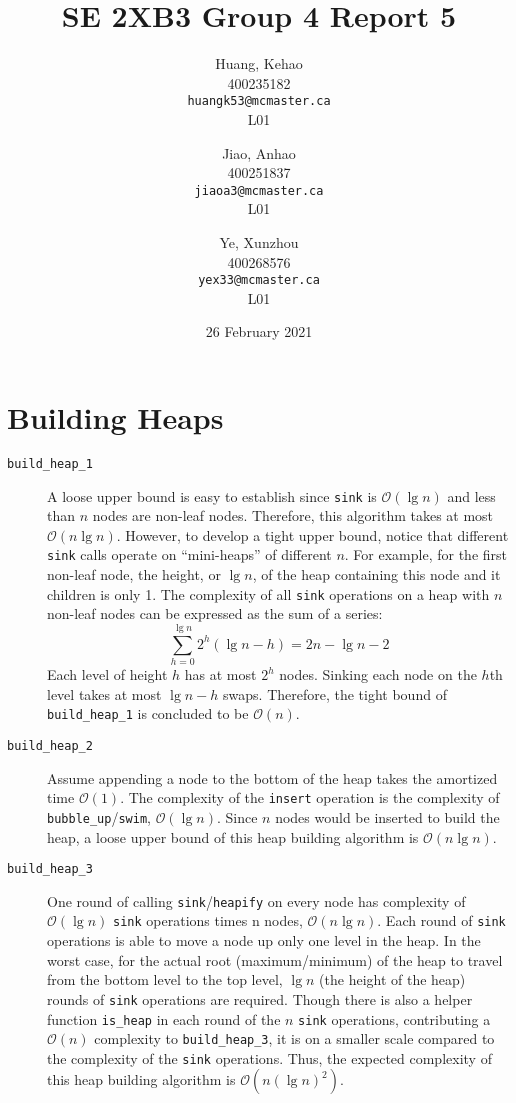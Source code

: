 \documentclass[titlepage, 12pt]{article}
\title{SE 2XB3 Group 4 Report 5}
\author{
  Huang, Kehao \\
  400235182 \\
  \texttt{huangk53@mcmaster.ca} \\
  L01
  \and
  Jiao, Anhao \\
  400251837 \\
  \texttt{jiaoa3@mcmaster.ca} \\
  L01
  \and
  Ye, Xunzhou \\
  400268576 \\
  \texttt{yex33@mcmaster.ca} \\
  L01
}
\date{26 February 2021}
\begin{document}
\maketitle{}

\newpage{}

\section{Building Heaps}
\label{sec:build}

\begin{description}
\item[\texttt{build\_heap\_1}] A loose upper bound is easy to establish since
  \texttt{sink} is \(\mathcal{O}(\lg{n})\) and less than \(n\) nodes are
  non-leaf nodes. Therefore, this algorithm takes at most
  \(\mathcal{O}(n\lg{n})\). However, to develop a tight upper bound, notice that
  different \texttt{sink} calls operate on ``mini-heaps'' of different \(n\).
  For example, for the first non-leaf node, the height, or \(\lg{n}\), of the
  heap containing this node and it children is only 1. The complexity of all
  \texttt{sink} operations on a heap with \(n\) non-leaf nodes can be expressed
  as the sum of a series:
  \begin{displaymath}
    \sum_{h = 0}^{\lg{n}} 2^h (\lg{n} - h) = 2n - \lg{n} - 2
  \end{displaymath}
  Each level of height \(h\) has at most \(2^h\) nodes. Sinking each node on the
  \(h\)th level takes at most \(\lg{n} - h\) swaps. Therefore, the tight bound
  of \texttt{build\_heap\_1} is concluded to be \(\mathcal{O}(n)\).
\item[\texttt{build\_heap\_2}] Assume appending a node to the bottom of the heap
  takes the amortized time \(\mathcal{O}(1)\). The complexity of the
  \texttt{insert} operation is the complexity of
  \texttt{bubble\_up}/\texttt{swim}, \(\mathcal{O}(\lg{n})\). Since \(n\) nodes
  would be inserted to build the heap, a loose upper bound of this heap building
  algorithm is \(\mathcal{O}(n\lg{n})\).
\item[\texttt{build\_heap\_3}] One round of calling
  \texttt{sink}/\texttt{heapify} on every node has complexity of
  \(\mathcal{O}(\lg{n})\) \texttt{sink} operations times n nodes,
  \(\mathcal{O}(n\lg{n})\). Each round of \texttt{sink} operations is able to
  move a node up only one level in the heap. In the worst case, for the actual
  root (maximum/minimum) of the heap to travel from the bottom level to the top
  level, \(\lg{n}\) (the height of the heap) rounds of \texttt{sink} operations
  are required. Though there is also a helper function \texttt{is\_heap} in each
  round of the \(n\) \texttt{sink} operations, contributing a \(\mathcal{O}(n)\)
  complexity to \texttt{build\_heap\_3}, it is on a smaller scale compared to
  the complexity of the \texttt{sink} operations. Thus, the expected complexity
  of this heap building algorithm is \(\mathcal{O}(n (\lg{n})^2)\).
\end{description}
\end{document}
